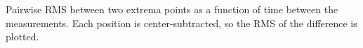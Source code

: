 Pairwise RMS between two extrema points as a function of time between the measurements. Each position is center-subtracted, so the RMS of the difference is plotted.
\label{fig:inst_time_var_pairs}